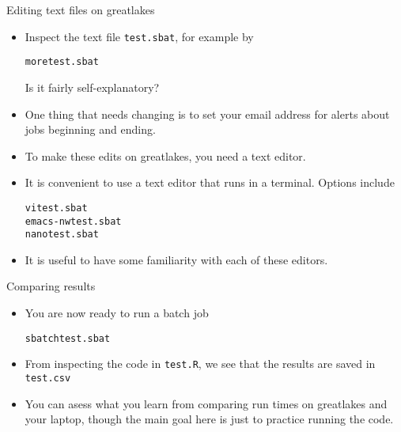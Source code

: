 \begin{frame}[fragile]{Editing text files on greatlakes}

\begin{itemize}
\item Inspect the text file \texttt{test.sbat}, for example by
\begin{knitrout}\small
{}\color{fgcolor}\begin{kframe}
\begin{alltt}
more test.sbat
\end{alltt}
\end{kframe}
\end{knitrout}
Is it fairly self-explanatory?
\item One thing that needs changing is to set your email address for alerts about jobs beginning and ending. 
\item To make these edits on greatlakes, you need a text editor.
\item It is convenient to use a text editor that runs in a terminal. Options include
\begin{knitrout}\small
{}\color{fgcolor}\begin{kframe}
\begin{alltt}
vi test.sbat
emacs -nw test.sbat
nano test.sbat
\end{alltt}
\end{kframe}
\end{knitrout}
\item It is useful to have some familiarity with each of these editors.
\end{itemize}

\end{frame}

\begin{frame}[fragile]{Comparing results}

\begin{itemize}
\item You are now ready to run a batch job
\begin{knitrout}\small
{}\color{fgcolor}\begin{kframe}
\begin{alltt}
sbatch test.sbat
\end{alltt}
\end{kframe}
\end{knitrout}
\item
From inspecting the code in \texttt{test.R}, we see that the results are saved in \texttt{test.csv}
\item 
You can asess what you learn from comparing run times on greatlakes and your laptop, though the main goal here is just to practice running the code.

\end{itemize}

\end{frame}


